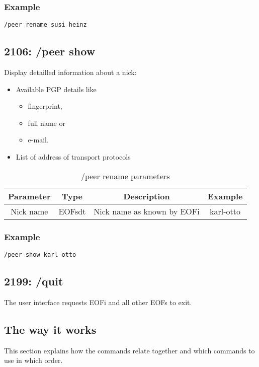 \documentclass[12pt,a4paper]{book}
\begin{document}
\subsubsection{Example}
\begin{verbatim}
/peer rename susi heinz
\end{verbatim}

\subsection{2106: /peer show}
Display detailled information about a nick:
\begin{itemize}
\item Available PGP details like
\begin{itemize}
\item fingerprint,
\item full name or
\item e-mail.
\end{itemize}
\item List of address of transport protocols
\end{itemize}

%
\begin{longtable}{|c|c|c|c|}
\caption{/peer rename parameters}\\
\hline
\textbf{Parameter} & \textbf{Type} & \textbf{Description} & \textbf{Example}\\
\hline
Nick name & EOFsdt & Nick name as known by EOFi & karl-otto\\
\hline
\end{longtable}

\subsubsection{Example}
\begin{verbatim}
/peer show karl-otto
\end{verbatim}

\subsection{2199: /quit}
The user interface requests EOFi and all other EOFs to exit.
\subsection{The way it works}
This section explains how the commands relate together and which commands to use
in which order.
\end{document}
